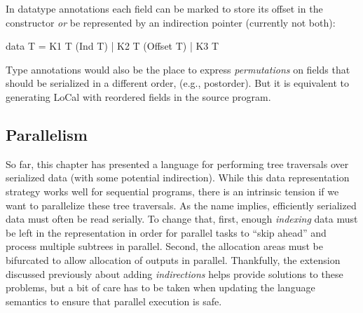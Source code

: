 \documentclass[showabstract,showacknowledgments,showpreface,showdedication,school]{iuphd}
\theoremstyle{nonumberplain}
\newcommand{\sysname}[0]{LoCal\xspace}
\newcommand{\ourcalc}[0]{\sysname}
\begin{document}
In datatype annotations each field can be marked to store its offset in the constructor {\em
  or} be represented by an indirection pointer (currently not both):
\begin{code}
data T = K1 T (Ind T) | K2 T (Offset T) | K3 T
\end{code}
Type annotations would also be the place to express {\em permutations} on fields
that should be serialized in a different order, (e.g., postorder).  But it is
equivalent to generating \ourcalc{} with reordered fields in the source program.

\subsection{Parallelism}\label{subsec:parallelism}

So far, this chapter has presented a language for performing tree traversals
over serialized data (with some potential indirection). While this data representation
strategy works well for sequential programs, there is an intrinsic tension if we
want to parallelize these tree traversals. As the name implies, efficiently
serialized data must often be read serially. To change that, first, enough
\emph{indexing} data must be left in the representation in order for parallel tasks to
``skip ahead'' and process multiple subtrees in parallel. Second, the allocation
areas must be bifurcated to allow allocation of outputs in parallel.
Thankfully, the extension discussed previously about adding \emph{indirections}
helps provide solutions to these problems, but a bit of care has to be taken
when updating the language semantics to ensure that parallel execution is safe.
\end{document}
